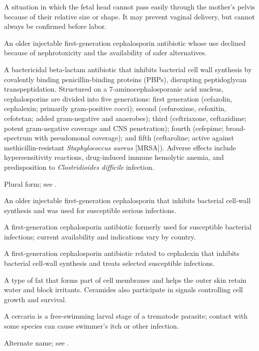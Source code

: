  A situation in which the fetal head cannot pass easily through the mother's pelvis because of their relative size or shape. It may prevent vaginal delivery, but cannot always be confirmed before labor.

 An older injectable first-generation cephalosporin antibiotic whose use declined because of nephrotoxicity and the availability of safer alternatives.

 A bactericidal beta-lactam antibiotic that inhibits bacterial cell wall synthesis by covalently binding penicillin-binding proteins (PBPs), disrupting peptidoglycan transpeptidation. Structured on a 7-aminocephalosporanic acid nucleus, cephalosporins are divided into five generations: first generation (cefazolin, cephalexin; primarily gram-positive cocci); second (cefuroxime, cefoxitin, cefotetan; added gram-negative and anaerobes); third (ceftriaxone, ceftazidime; potent gram-negative coverage and CNS penetration); fourth (cefepime; broad-spectrum with pseudomonal coverage); and fifth (ceftaroline; active against methicillin-resistant \textit{Staphylococcus aureus} [MRSA]). Adverse effects include hypersensitivity reactions, drug-induced immune hemolytic anemia, and predisposition to \textit{Clostridioides difficile} infection.

 Plural form; see .

 An older injectable first-generation cephalosporin that inhibits bacterial cell-wall synthesis and was used for susceptible serious infections.

 A first-generation cephalosporin antibiotic formerly used for susceptible bacterial infections; current availability and indications vary by country.

 A first-generation cephalosporin antibiotic related to cephalexin that inhibits bacterial cell-wall synthesis and treats selected susceptible infections.

 A type of fat that forms part of cell membranes and helps the outer skin retain water and block irritants. Ceramides also participate in signals controlling cell growth and survival.

 A cercaria is a free-swimming larval stage of a trematode parasite; contact with some species can cause swimmer’s itch or other infection.

 Alternate name; see .

